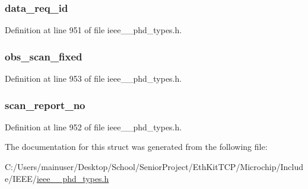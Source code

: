 \subsubsection[{data\+\_\+req\+\_\+id}]{ data\+\_\+req\+\_\+id}\label{struct___scan_report_info_fixed_a1c786af4096ed61c5f6cfdf27f317b70}


Definition at line 951 of file ieee\+\_\+\_\+phd\+\_\+types.\+h.

\hypertarget{struct___scan_report_info_fixed_a7bf9f6540d9ed76586557937ba083637}{}
\subsubsection[{obs\+\_\+scan\+\_\+fixed}]{ obs\+\_\+scan\+\_\+fixed}\label{struct___scan_report_info_fixed_a7bf9f6540d9ed76586557937ba083637}


Definition at line 953 of file ieee\+\_\+\_\+phd\+\_\+types.\+h.

\hypertarget{struct___scan_report_info_fixed_a21f75132869d4d200ffe01d91b4736d8}{}
\subsubsection[{scan\+\_\+report\+\_\+no}]{ scan\+\_\+report\+\_\+no}\label{struct___scan_report_info_fixed_a21f75132869d4d200ffe01d91b4736d8}


Definition at line 952 of file ieee\+\_\+\_\+phd\+\_\+types.\+h.



The documentation for this struct was generated from the following file\+:\begin{DoxyCompactItemize}
\item 
C\+:/\+Users/mainuser/\+Desktop/\+School/\+Senior\+Project/\+Eth\+Kit\+T\+C\+P/\+Microchip/\+Include/\+I\+E\+E\+E/\hyperlink{ieee__11073__phd__types_8h}{ieee\+\_\+\_\+phd\+\_\+types.\+h}\end{DoxyCompactItemize}
